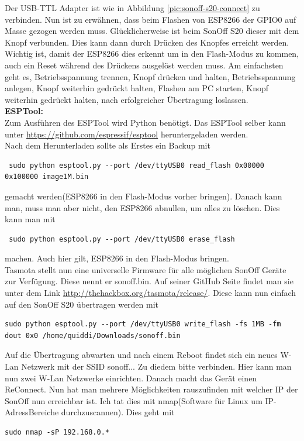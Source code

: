 \documentclass[11pt,fleqn]{book} %
\numberwithin{equation}{section} %
\numberwithin{figure}{section} %
\numberwithin{table}{section} %
\begin{document}
Der USB-TTL Adapter ist wie in Abbildung \ref{pic:sonoff-s20-connect} zu verbinden. Nun ist zu erwähnen, dass beim Flashen von ESP8266 der GPIO0 auf Masse gezogen werden muss. Glücklicherweise ist beim SonOff S20 dieser mit dem Knopf verbunden. Dies kann dann durch Drücken des Knopfes erreicht werden. Wichtig ist, damit der ESP8266 dies erkennt um in den Flash-Modus zu kommen, auch ein Reset während des Drückens ausgelöst werden muss. Am einfachsten geht es, Betriebsspannung trennen, Knopf drücken und halten, Betriebsspannung anlegen, Knopf weiterhin gedrückt halten, Flashen am PC starten, Knopf weiterhin gedrückt halten, nach erfolgreicher Übertragung loslassen.\\
\textbf{ESPTool:}\\
Zum Ausführen des ESPTool wird Python benötigt. Das ESPTool selber kann unter \url{https://github.com/espressif/esptool} heruntergeladen werden.\\ 
Nach dem Herunterladen sollte als Erstes ein Backup mit
\begin{lstlisting}
 sudo python esptool.py --port /dev/ttyUSB0 read_flash 0x00000 0x100000 image1M.bin
\end{lstlisting}
gemacht werden(ESP8266 in den Flash-Modus vorher bringen). Danach kann man, muss man aber nicht, den ESP8266 abnullen, um alles zu löschen. Dies kann man mit
\begin{lstlisting}
 sudo python esptool.py --port /dev/ttyUSB0 erase_flash
\end{lstlisting}
machen. Auch hier gilt, ESP8266 in den Flash-Modus bringen.\\
Tasmota stellt nun eine universelle Firmware für alle möglichen SonOff Geräte zur Verfügung. Diese nennt er \glqq sonoff.bin\grqq. Auf seiner GitHub Seite findet man sie unter dem Link \url{http://thehackbox.org/tasmota/release/}. Diese kann nun einfach auf den SonOff S20 übertragen werden mit 
\begin{lstlisting}
sudo python esptool.py --port /dev/ttyUSB0 write_flash -fs 1MB -fm dout 0x0 /home/quiddi/Downloads/sonoff.bin 
\end{lstlisting}
Auf die Übertragung abwarten und nach einem Reboot findet sich ein neues W-Lan Netzwerk mit der SSID sonoff... Zu diedem bitte verbinden. Hier kann man nun zwei W-Lan Netzwerke einrichten. Danach macht das Gerät einen ReConnect. Nun hat man mehrere Möglichkeiten rauszufinden mit welcher IP der SonOff nun erreichbar ist. Ich tat dies mit nmap(Software für Linux um IP-AdressBereiche durchzuscannen). Dies geht mit 
\begin{lstlisting}
sudo nmap -sP 192.168.0.*
\end{lstlisting}
\end{document}
